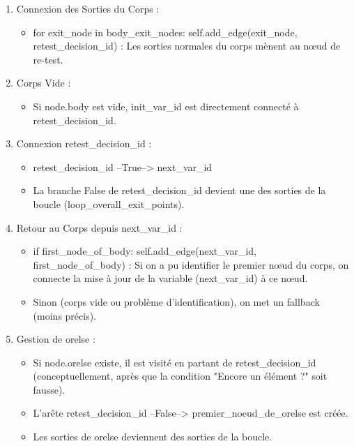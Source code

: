 \documentclass[11pt,a4paper]{article}
\begin{document}
\begin{enumerate}
    \item Connexion des Sorties du Corps :
    \begin{itemize}
        \item for exit\_node in body\_exit\_nodes: self.add\_edge(exit\_node, retest\_decision\_id) : Les sorties normales du corps mènent au nœud de re-test.
    \end{itemize}

    \item Corps Vide :
    \begin{itemize}
        \item Si node.body est vide, init\_var\_id est directement connecté à retest\_decision\_id.
    \end{itemize}

    \item Connexion retest\_decision\_id :
    \begin{itemize}
        \item retest\_decision\_id --True--> next\_var\_id
        \item La branche False de retest\_decision\_id devient une des sorties de la boucle (loop\_overall\_exit\_points).
    \end{itemize}

    \item Retour au Corps depuis next\_var\_id :
    \begin{itemize}
        \item if first\_node\_of\_body: self.add\_edge(next\_var\_id, first\_node\_of\_body) : Si on a pu identifier le premier nœud du corps, on connecte la mise à jour de la variable (next\_var\_id) à ce nœud.
        \item Sinon (corps vide ou problème d'identification), on met un fallback (moins précis).
    \end{itemize}

    \item Gestion de orelse :
    \begin{itemize}
        \item Si node.orelse existe, il est visité en partant de retest\_decision\_id (conceptuellement, après que la condition "Encore un élément ?" soit fausse).
        \item L'arête retest\_decision\_id --False--> premier\_noeud\_de\_orelse est créée.
        \item Les sorties de orelse deviennent des sorties de la boucle.
    \end{itemize}
    
\end{enumerate}
\end{document}
